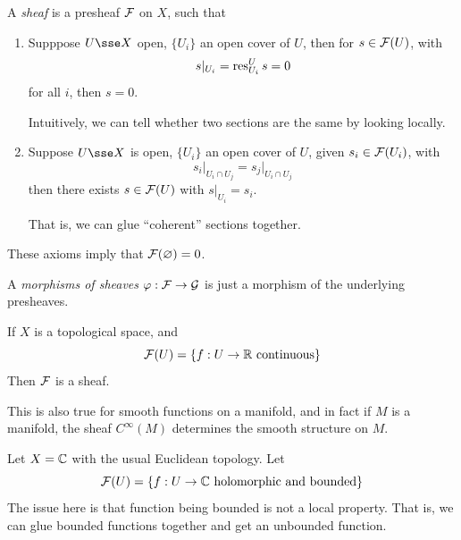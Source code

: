 \documentclass{article}
\begin{document}
\begin{definition}
    [sheaf]
    A \emph{sheaf} is a presheaf \(\mathcal{F}\) on \(X\), such that
    \begin{enumerate}[label=S\arabic*.]
        \item Supppose \(U \sse X\) open, \(\{U_i\}\) an open cover of \(U\), then for \(s \in \mathcal{F}(U)\), with
        \[s \vert_{U_i} = \operatorname{res}^U_{U_i}s = 0\]
        for all \(i\), then \(s = 0\). \begin{addendum}
            Intuitively, we can tell whether two sections are the same by looking locally.
        \end{addendum}
        \item Suppose \(U \sse X\) is open, \(\{U_i\}\) an open cover of \(U\), given \(s_i \in \mathcal{F}(U_i)\), with
        \[s_i\vert_{U_i \cap U_j} = s_j\vert_{U_i \cap U_j}\]
        then there exists \(s \in \mathcal{F}(U)\) with \(s\vert_{U_i} = s_i\). \begin{addendum}
            That is, we can glue ``coherent'' sections together.
        \end{addendum}
    \end{enumerate}
\end{definition}

\begin{remark}
    These axioms imply that \(\mathcal{F}(\varnothing) = 0\).
\end{remark}

\begin{definition}
    A \emph{morphisms of sheaves} \(\varphi : \mathcal{F} \to \mathcal{G}\) is just a morphism of the underlying presheaves.
\end{definition}

\begin{example}
    If \(X\) is a topological space, and
    \[\mathcal{F}(U) = \left\{f : U \to \mathbb{R} \text{ continuous}\right\}\]
    Then \(\mathcal{F}\) is a sheaf. \begin{addendum}
        This is also true for smooth functions on a manifold, and in fact if \(M\) is a manifold, the sheaf \(C^\infty(M)\) determines the smooth structure on \(M\).
    \end{addendum}
\end{example}

\begin{example}
     Let \(X = \mathbb{C}\) with the usual Euclidean topology. Let
    \[\mathcal{F}(U) = \left\{f : U \to \mathbb{C} \text{ holomorphic and bounded}\right\}\]
    The issue here is that function being bounded is not a local property. That is, we can glue bounded functions together and get an unbounded function.
\end{example}
\end{document}
